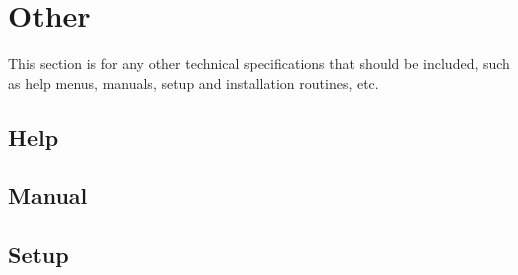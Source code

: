 \section{Other} %
This section is for any other technical specifications that should be included,
such as help menus, manuals, setup and installation routines, etc.
\subsection{Help} %

\subsection{Manual} %

\subsection{Setup} %
